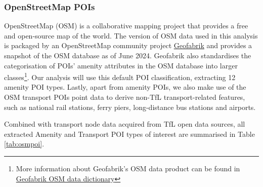 \subsubsection*{OpenStreetMap POIs}
OpenStreetMap (OSM) is a collaborative mapping project that provides a free and open-source map of the world. The version of OSM data used in this analysis is packaged by an OpenStreetMap community project \href{https://www.geofabrik.de/en/geofabrik/openstreetmap.html}{Geofabrik} and provides a snapshot of the OSM database as of June 2024. Geofabrik also standardises the categorisation of POIs' amenity attributes in the OSM database into larger classes\footnote{More information about Geofabrik's OSM data product can be found in \href{https://www.geofabrik.de/data/geofabrik-osm-gis-standard-0.6.pdf}{Geofabrik OSM data dictionary}}. Our analysis will use this default POI classification, extracting 12 amenity POI types. Lastly, apart from amenity POIs, we also make use of the OSM transport POIs point data to derive non-TfL transport-related features, such as national rail stations, ferry piers, long-distance bus stations and airports. 

Combined with transport node data acquired from TfL open data sources, all extracted Amenity and Transport POI types of interest are summarised in Table \ref{tab:osmpoi}.

